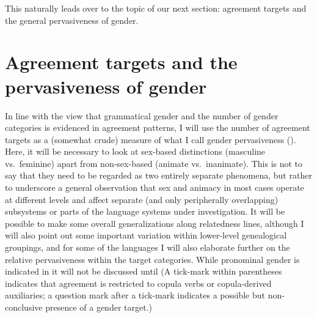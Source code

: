 \documentclass[output=collectionpaper]{langsci/langscibook}
\begin{document}
This naturally leads over to the topic of our next section: agreement targets and the general pervasiveness of gender.

\section{Agreement targets and the pervasiveness of gender}

In line with the view that grammatical gender and the number of gender categories is evidenced in agreement patterns, I will use the number of agreement targets as a (somewhat crude) measure of what I call gender pervasiveness (). Here, it will be necessary to look at sex-based distinctions (masculine vs.\ feminine) apart from non-sex-based (animate vs.\ inanimate). This is not to say that they need to be regarded as two entirely separate phenomena, but rather to underscore a general observation that sex and animacy in most cases operate at different levels and affect separate (and only peripherally overlapping) subsystems or parts of the language systems under investigation. It will be possible to make some overall generalizations along relatedness lines, although I will also point out some important variation within lower-level genealogical groupings, and for some of the languages I will also elaborate further on the relative pervasiveness within the target categories. While pronominal gender is indicated in  it will not be discussed until  (A tick-mark within parentheses indicates that agreement is restricted to copula verbs or copula-derived auxiliaries; a question mark after a tick-mark indicates a possible but non-conclusive presence of a gender target.)
\end{document}
